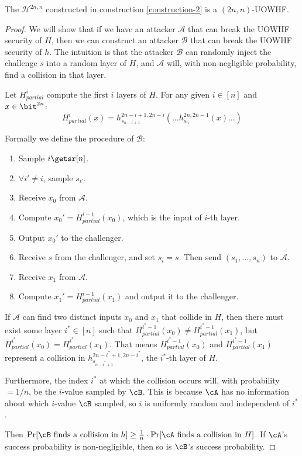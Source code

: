 \begin{claim}
    The $\mathcal{H}^{2n, n}$ constructed in construction \ref{construction-2} is a $(2n, n)$-UOWHF.
\end{claim}
\begin{proof}
    We will show that if we have an attacker $\mathcal{A}$ that can break the UOWHF security of $H$, then we can construct an attacker $\mathcal{B}$ that can break the UOWHF security of $h$. The intuition is that the attacker $\mathcal{B}$ can randomly inject the challenge $s$ into a random layer of $H$, and $\mathcal{A}$ will, with non-negligible probability, find a collision in that layer.

    Let $H_{partial}^i$ compute the first $i$ layers of $H$. For any given $i \in [n]$ and $x \in \bit^{2n}$:
    \[H_{partial}^i(x) = h_{s_{n-i+1}}^{2n-i+1, 2n-i}( \dots h_{s_n}^{2n, 2n-1}(x) \dots )\]

    Formally we define the procedure of $\mathcal{B}$:
    \begin{enumerate}
        \item Sample $i \getsr [n]$.
        \item $\forall i'\neq i$, sample $s_{i'}$.
        \item Receive $x_0$ from $\mathcal{A}$.
        \item Compute $x_0' = H_{partial}^{i-1}(x_0)$, which is the input of $i$-th layer.
        \item Output $x_0'$ to the challenger.
        \item Receive $s$ from the challenger, and set $s_i = s$. Then send $(s_1,\dots,s_n)$ to $\mathcal{A}$.
        \item Receive $x_1$ from $\mathcal{A}$.
        \item Compute $x_1' = H_{partial}^{i-1}(x_1)$ and output it to the challenger.
    \end{enumerate}

If $\mathcal{A}$ can find two distinct inputs $x_0$ and $x_1$ that collide in $H$, then there must exist some layer $i^* \in [n]$ such that $H_{partial}^{i^*-1}(x_0) \neq H_{partial}^{i^*-1}(x_1)$, but $H_{partial}^{i^*}(x_0) = H_{partial}^{i^*}(x_1)$. That means $H_{partial}^{i^*-1}(x_0)$ and $H_{partial}^{i^*-1}(x_1)$ represent a collision in $h_{s_{n-i^*+1}}^{2n-i^*+1, 2n-i^*}$, the $i^*$-th layer of $H$. 

Furthermore, the index $i^*$ at which the collision occurs will, with probability $= 1/n$, be the $i$-value sampled by $\cB$. This is because $\cA$ has no information about which $i$-value $\cB$ sampled, so $i$ is uniformly random and independent of $i^*$.

Then $\Pr[\cB \text{ finds a collision in } h] \geq \frac{1}{n} \cdot \Pr[\cA \text{ finds a collision in } H]$. If $\cA$'s success probability is non-negligible, then so is $\cB$'s success probability. 
\end{proof}
\vspace{5mm}

